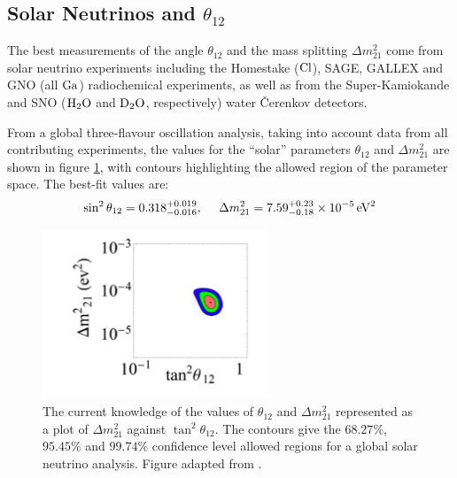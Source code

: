 \subsection{Solar Neutrinos and $\theta_{12}$}
The best measurements of the angle $\theta_{12}$ and the mass splitting $\Delta m^2_{21}$ come from solar neutrino experiments including the Homestake ($\mathrm{Cl}$), SAGE\citep{SAGE2002}, GALLEX\citep{GALLEX1999} and GNO\citep{GNO2005} (all $\mathrm{Ga}$) radiochemical experiments, as well as from the Super-Kamiokande and SNO ($\mathrm{H}_2\mathrm{O}$ and $\mathrm{D}_2\mathrm{O}$, respectively) water Čerenkov detectors.

From a global three-flavour oscillation analysis, taking into account data from all contributing experiments, the values for the ``solar'' parameters $\theta_{12}$ and $\Delta m^2_{21}$ are shown in figure \ref{fig:theta_12_confidence}, with contours highlighting the allowed region of the parameter space. The best-fit values are\citep{Mezzetto2010}:
\begin{equation}\label{eqn:solar_parameters}
\sin^2 \theta_{12} = 0.318^{+0.019}_{-0.016} , ~~~~ \Delta m^2_{21} =  7.59^{+0.23}_{-0.18} \times 10^{-5} \,\mathrm{eV}^2
\end{equation}

\begin{figure}
\centering
\includegraphics[width=0.6\textwidth]{chapters/neutrinophysics_images/theta_12}
\caption[Allowed region for $\theta_{12}$ and $\Delta m^2_{21}$]{\label{fig:theta_12_confidence}The current knowledge of the values of $\theta_{12}$ and $\Delta m^2_{21}$ represented as a plot of $\Delta m^2_{21}$ against $\tan^2\theta_{12}$. The contours give the $68.27\%$, $95.45\%$ and $99.74\%$ confidence level allowed regions for a global solar neutrino analysis. Figure adapted from \citep{Bellini2012}.}
\end{figure}

